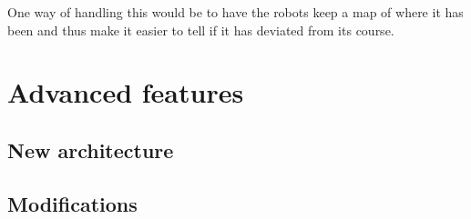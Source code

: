 \documentclass[12pt, a4paper]{article}
\begin{document}
One way of handling this would be to have the robots keep a map of where it has been and thus make it easier to tell if it has deviated from its course. \\



\section{Advanced features}

\subsection{New architecture}
\subsection{Modifications}
\end{document}
